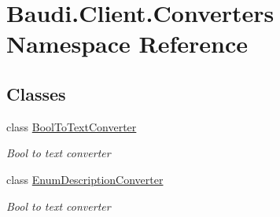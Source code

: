 \hypertarget{namespace_baudi_1_1_client_1_1_converters}{}\section{Baudi.\+Client.\+Converters Namespace Reference}
\label{namespace_baudi_1_1_client_1_1_converters}
\subsection*{Classes}
\begin{DoxyCompactItemize}
\item 
class \hyperlink{class_baudi_1_1_client_1_1_converters_1_1_bool_to_text_converter}{Bool\+To\+Text\+Converter}
\begin{DoxyCompactList}\small\item\em Bool to text converter \end{DoxyCompactList}\item 
class \hyperlink{class_baudi_1_1_client_1_1_converters_1_1_enum_description_converter}{Enum\+Description\+Converter}
\begin{DoxyCompactList}\small\item\em Bool to text converter \end{DoxyCompactList}\end{DoxyCompactItemize}
